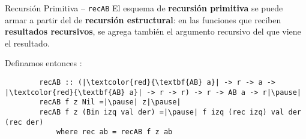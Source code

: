 \begin{frame}[fragile]{Recursión Primitiva -- \texttt{recAB}}
    El esquema de \textbf{recursión primitiva} se puede armar a partir del de \textbf{recursión estructural}: en las funciones que reciben \textbf{resultados recursivos}, se agrega también el argumento recursivo del que viene el resultado.

    \pause

    Definamos entonces :

    \pause
    
    \begin{verbatim}
        recAB :: (|\textcolor{red}{\textbf{AB} a}| -> r -> a -> |\textcolor{red}{\textbf{AB} a}| -> r -> r) -> r -> AB a -> r|\pause|
        recAB f z Nil =|\pause| z|\pause|
        recAB f z (Bin izq val der) =|\pause| f izq (rec izq) val der (rec der)
            where rec ab = recAB f z ab
    \end{verbatim}
\end{frame}
